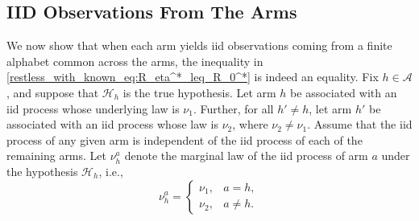 \subsection{IID Observations From The Arms}\label{restless_with_known_subsec:iid_observations_from_arms}
We now show that when each arm yields iid observations coming from a finite alphabet common across the arms, the inequality in \eqref{restless_with_known_eq:R_eta^*_leq_R_0^*} is indeed an equality. Fix $h\in \mathcal{A}$, and suppose that $\mathcal{H}_h$ is the true hypothesis. Let arm $h$ be associated with an iid process whose underlying law is $\nu_1$. Further, for all $h'\neq h$, let arm $h'$ be associated with an iid process whose law is $\nu_2$, where $\nu_2\neq \nu_1$. Assume that the iid process of any given arm is independent of the iid process of each of the remaining arms. Let $\nu_h^a$ denote the marginal law of the iid process of arm $a$ under the hypothesis $\mathcal{H}_h$, i.e.,
\begin{equation}
	\nu_h^a=\begin{cases}
		\nu_1,&a=h,\\
		\nu_2,&a\neq h.
	\end{cases}\label{restless_with_known_eq:nu_h^a}
\end{equation}

